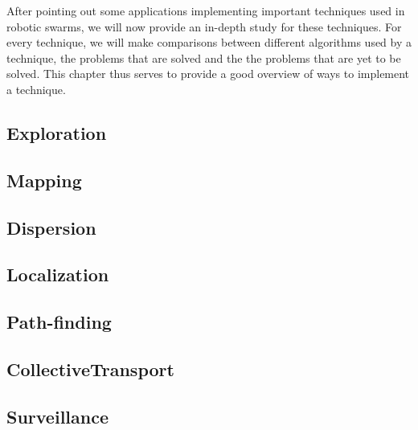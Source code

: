 
After pointing out some applications implementing important techniques used in robotic swarms, we will now provide an in-depth study for these techniques. For every technique, we will make comparisons between different algorithms used by a technique, the problems that are solved and the the problems that are yet to be solved. This chapter thus serves to provide a good overview of ways to implement a technique. 
    \subsection{Exploration}
    
    \subsection{Mapping}
    
    \subsection{Dispersion}
    
    \subsection{Localization}
    
    \subsection{Path-finding}
    
    \subsection{CollectiveTransport}
    
    \subsection{Surveillance}
    
